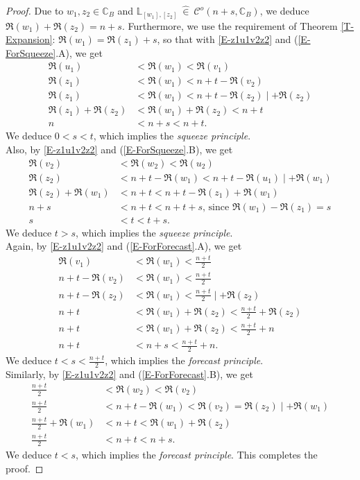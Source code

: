 \documentclass[10pt,a4paper]{amsart}
\newcommand{\C}{\mathcal{C}}
\newcommand{\CC}{\mathbb{C}}
\newcommand{\LL}{\mathbb{L}}
\newcommand{\inn}{~ \hat{\in}~ }
\begin{document}
\begin{proof}
Due to $w_1,z_2\in\CC_B$ and $\LL_{[w_1],[z_2]}\inn \C^o(n+s,\CC_B)$, we deduce $\Re(w_1)+\Re(z_2)=n+s$. Furthermore, we use the requirement of Theorem \ref{T-Expansion}: $\Re(w_1)=\Re(z_1)+s$, so that with \eqref{E-z1u1v2z2} and (\ref{E-ForSqueeze}.A), we get
\begin{align*}
\Re(u_1)&<\Re(w_1)<\Re(v_1)\\
\Re(z_1)&<\Re(w_1)<n+t-\Re(v_2)\\
\Re(z_1)&<\Re(w_1)<n+t-\Re(z_2)\mid +\Re(z_2)\\
\Re(z_1)+\Re(z_2)&<\Re(w_1)+\Re(z_2)<n+t\\
n&<n+s<n+t.
\end{align*} 
We deduce $0<s<t$, which implies the \emph{squeeze principle}.\\

Also, by \eqref{E-z1u1v2z2} and (\ref{E-ForSqueeze}.B), we get
\begin{align*}
\Re(v_2)&<\Re(w_2)<\Re(u_2)\\
\Re(z_2)&<n+t-\Re(w_1)<n+t-\Re(u_1)\mid +\Re(w_1)\\
\Re(z_2)+\Re(w_1)&<n+t<n+t-\Re(z_1)+\Re(w_1)\\
n+s&<n+t<n+t+s\text{, since }\Re(w_1)-\Re(z_1)=s\\
s&<t<t+s.
\end{align*}
We deduce $t>s$, which implies the \emph{squeeze principle}.\\

Again, by \eqref{E-z1u1v2z2} and (\ref{E-ForForecast}.A), we get
\begin{align*}
\Re(v_1)&<\Re(w_1)<\frac{n+t}{2}\\
n+t-\Re(v_2)&<\Re(w_1)<\frac{n+t}{2}\\
n+t-\Re(z_2)&<\Re(w_1)<\frac{n+t}{2}\mid +\Re(z_2) \\
n+t&<\Re(w_1)+\Re(z_2)<\frac{n+t}{2}+\Re(z_2)\\
n+t&<\Re(w_1)+\Re(z_2)<\frac{n+t}{2}+n\\
n+t&<n+s<\frac{n+t}{2}+n.
\end{align*}
We deduce $t<s<\frac{n+t}{2}$, which implies the \emph{forecast principle}.\\

Similarly, by \eqref{E-z1u1v2z2} and (\ref{E-ForForecast}.B), we get
\begin{align*}
\frac{n+t}{2}&<\Re(w_2)<\Re(v_2)\\
\frac{n+t}{2}&<n+t-\Re(w_1)<\Re(v_2)=\Re(z_2)\mid +\Re(w_1)\\
\frac{n+t}{2}+\Re(w_1)&<n+t<\Re(w_1)+\Re(z_2)\\
\frac{n+t}{2}&<n+t<n+s.
\end{align*}
We deduce $t<s$, which implies the \emph{forecast principle}. This completes the proof.
\end{proof}
\end{document}
